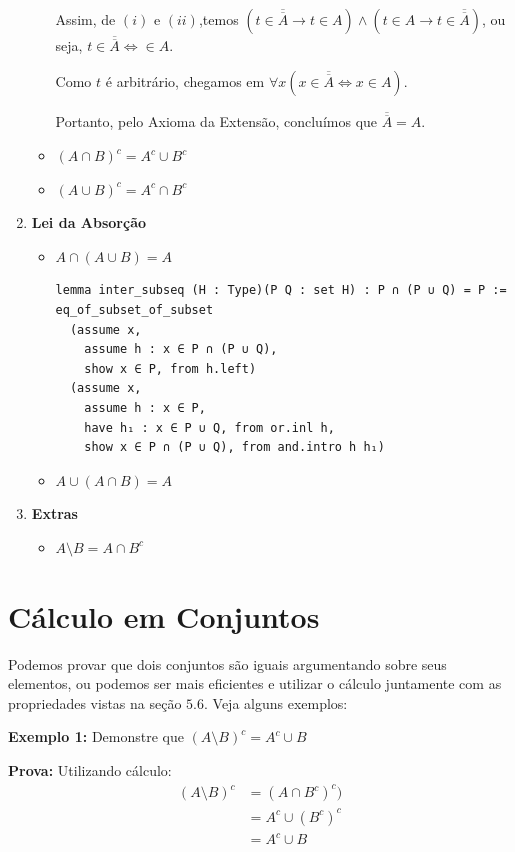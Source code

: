 \begin{enumerate}
\begin{itemize}
Assim, de $(i)$ e $(ii)$,temos $  (t \in \overline {\overline {A}} \rightarrow t \in A) \wedge (t \in {A} \rightarrow t \in \overline {\overline{A}} )$, ou seja, $t \in \overline {\overline {A}} \iff \in A $.

Como $t$ é arbitrário, chegamos em $\forall x (x \in \overline {\overline {A}} \iff x \in A) $.

Portanto, pelo Axioma da Extensão, concluímos que $\overline {\overline {A}} = A$.

\qquad

\item $(A \cap B)^c = A^c \cup B^c$
\item $(A \cup B)^c = A^c \cap B^c$
\end{itemize}

\item{\textbf{Lei da Absorção}}
\begin{itemize}
\item $A \cap (A \cup B) = A$

\begin{lstlisting}
lemma inter_subseq (H : Type)(P Q : set H) : P ∩ (P ∪ Q) = P :=
eq_of_subset_of_subset
  (assume x,
    assume h : x ∈ P ∩ (P ∪ Q),
    show x ∈ P, from h.left)
  (assume x,
    assume h : x ∈ P,
    have h₁ : x ∈ P ∪ Q, from or.inl h,
    show x ∈ P ∩ (P ∪ Q), from and.intro h h₁)\end{lstlisting}

\item $A \cup (A \cap B) = A$
\end{itemize}

\item{\textbf{Extras}}
\begin{itemize}
\item $A \setminus B = A \cap B^c$
\end{itemize}
\end{enumerate}

\section{Cálculo em Conjuntos}
Podemos provar que dois conjuntos são iguais argumentando sobre seus elementos, ou podemos ser mais eficientes e utilizar o cálculo juntamente com as propriedades vistas na seção $5.6$. Veja alguns exemplos:

\textbf{Exemplo 1:} Demonstre que $(A \setminus B)^c = A^c \cup B$

\textbf{Prova:} Utilizando cálculo:
\begin{equation*}
\begin{aligned}
  (A \setminus B)^c &= (A \cap B^c)^c)\\
  &= A^c \cup (B^c)^c\\
  & = A^c \cup B
\end{aligned}
\end{equation*}

